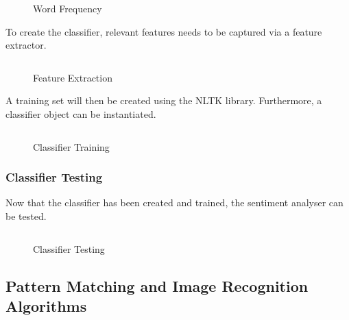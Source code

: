 \begin{figure}[h!]
  \centering
  \begin{minipage}{14cm}
    \centering
    \inputminted[fontsize=\footnotesize]{python}{inc/snippets/classifier.py}
    \caption{Word Frequency}
    \label{fig:sentiment_analysis_step2a}
  \end{minipage}
\end{figure}

To create the classifier, relevant features needs to be captured via a feature extractor.

\begin{figure}[h!]
  \centering
  \begin{minipage}{14cm}
    \centering
    \inputminted[fontsize=\footnotesize]{python}{inc/snippets/classifierB.py}
    \caption{Feature Extraction}
    \label{fig:sentiment_analysis_step2b}
  \end{minipage}
\end{figure}

A training set will then be created using the NLTK library. Furthermore, a classifier object can be instantiated.

\begin{figure}[h!]
  \centering
  \begin{minipage}{14cm}
    \centering
    \inputminted[fontsize=\footnotesize]{python}{inc/snippets/classifierC.py}
    \caption{Classifier Training}
    \label{fig:sentiment_analysis_step2b}
  \end{minipage}
\end{figure}

\subsubsection{Classifier Testing}

Now that the classifier has been created and trained, the sentiment analyser can be tested.

\begin{figure}[h!]
  \centering
  \begin{minipage}{14cm}
    \centering
    \inputminted[fontsize=\footnotesize]{python}{inc/snippets/classify.py}
    \caption{Classifier Testing}
    \label{fig:sentiment_analysis_step3}
  \end{minipage}
\end{figure}

\clearpage

\subsection{Pattern Matching and Image Recognition Algorithms}

